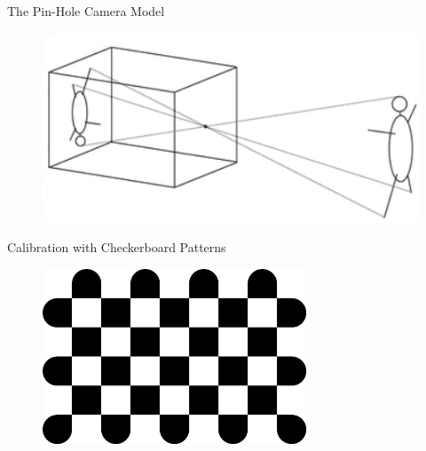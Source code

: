 \documentclass{beamer}
\begin{document}
\begin{frame}{The Pin-Hole Camera Model}
  \begin{figure}
    \centering
    \includegraphics[width=1.0\textwidth]{problem/pinhole}
  \end{figure}
\end{frame}


\begin{frame}{Calibration with Checkerboard Patterns}
  \begin{figure}
    \centering
    \includegraphics[width=0.7\textwidth]{problem/checkerboard_radon}
  \end{figure}
\end{frame}
\end{document}
